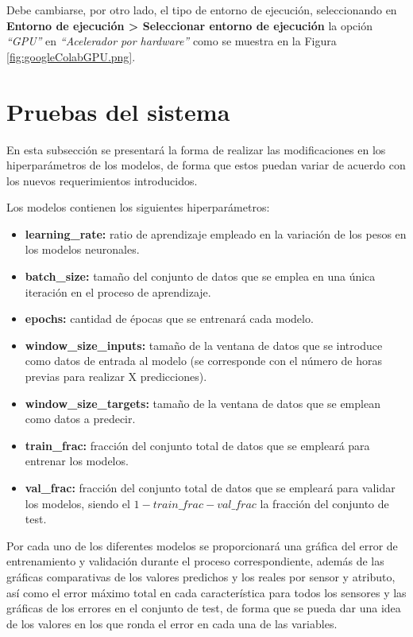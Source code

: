 Debe cambiarse, por otro lado, el tipo de entorno de ejecución, seleccionando en \textbf{Entorno de ejecución > Seleccionar entorno de ejecución}
la opción \textit{``GPU''} en \textit{``Acelerador por hardware''} como se muestra en la Figura \ref{fig:googleColabGPU.png}.


\section{Pruebas del sistema}
En esta subsección se presentará la forma de realizar las modificaciones en los hiperparámetros de los modelos, de forma que estos puedan variar de acuerdo con los nuevos requerimientos introducidos.

Los modelos contienen los siguientes hiperparámetros:
\begin{itemize}
    \item \textbf{learning\_rate:} ratio de aprendizaje empleado en la variación de los pesos en los modelos neuronales.
    \item \textbf{batch\_size:} tamaño del conjunto de datos que se emplea en una única iteración en el proceso
        de aprendizaje.
    \item \textbf{epochs:} cantidad de épocas que se entrenará cada modelo.
    \item \textbf{window\_size\_inputs:} tamaño de la ventana de datos que se introduce como datos de entrada al modelo
        (se corresponde con el número de horas previas para realizar X predicciones).
    \item \textbf{window\_size\_targets:} tamaño de la ventana de datos que se emplean como datos a predecir.
    \item \textbf{train\_frac:} fracción del conjunto total de datos que se empleará para entrenar los modelos.
    \item \textbf{val\_frac:} fracción del conjunto total de datos que se empleará para validar los modelos, siendo el 
        \(1 - train\_frac - val\_frac\) la fracción del conjunto de test.
\end{itemize}

Por cada uno de los diferentes modelos se proporcionará una gráfica del error de entrenamiento y validación
durante el proceso correspondiente, además de las gráficas comparativas de los valores predichos y 
los reales por sensor y atributo, así como el error máximo total en cada característica para todos los sensores y las gráficas
de los errores en el conjunto de test, de forma que se 
pueda dar una idea de los valores en los que ronda el error en cada una de las variables. 

